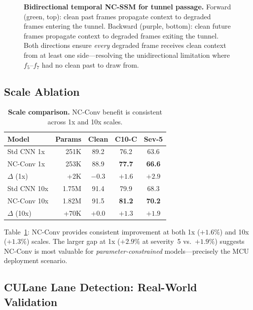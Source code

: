 \documentclass[10pt,twocolumn,letterpaper]{article}
\begin{document}
\begin{figure}[t]
{\begin{tikzpicture}
\end{tikzpicture}%
}
\caption{\textbf{Bidirectional temporal NC-SSM for tunnel passage.} \textcolor{green!50!black}{Forward} (green, top): clean past frames propagate context to degraded frames entering the tunnel. \textcolor{tempcolor}{Backward} (purple, bottom): clean future frames propagate context to degraded frames exiting the tunnel. Both directions ensure \emph{every} degraded frame receives clean context from at least one side---resolving the unidirectional limitation where $f_5$--$f_7$ had no clean past to draw from.}
\label{fig:temporal}
\end{figure}


\subsection{Scale Ablation}
\label{sec:scale}

\begin{table}[t]
\centering
\caption{\textbf{Scale comparison.} NC-Conv benefit is consistent across 1x and 10x scales.}
\label{tab:scale}
\small
\begin{tabular}{@{}lrccc@{}}
\toprule
\textbf{Model} & \textbf{Params} & \textbf{Clean} & \textbf{C10-C} & \textbf{Sev-5} \\
\midrule
Std CNN 1x  & 251K & 89.2 & 76.2 & 63.6 \\
NC-Conv 1x  & 253K & 88.9 & \textbf{77.7} & \textbf{66.6} \\
$\Delta$ (1x) & +2K & $-0.3$ & $+1.6$ & $+2.9$ \\
\midrule
Std CNN 10x & 1.75M & 91.4 & 79.9 & 68.3 \\
NC-Conv 10x & 1.82M & 91.5 & \textbf{81.2} & \textbf{70.2} \\
$\Delta$ (10x) & +70K & $+0.0$ & $+1.3$ & $+1.9$ \\
\bottomrule
\end{tabular}
\end{table}

Table~\ref{tab:scale}: NC-Conv provides consistent improvement at both 1x ($+1.6\%$) and 10x ($+1.3\%$) scales.
The larger gap at 1x ($+2.9\%$ at severity~5 vs.\ $+1.9\%$) suggests NC-Conv is most valuable for \emph{parameter-constrained} models---precisely the MCU deployment scenario.

\subsection{CULane Lane Detection: Real-World Validation}
\label{sec:culane}
\end{document}
